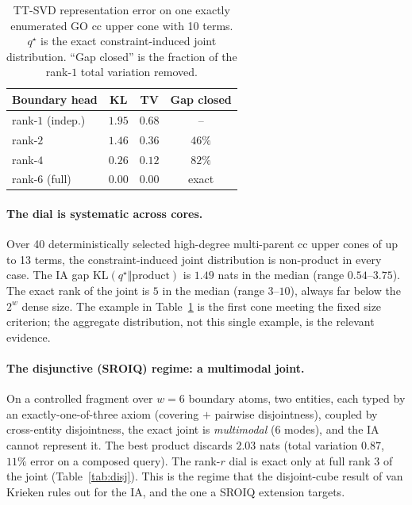 \documentclass[letterpaper]{article}
\begin{document}
\begin{table}[t]\centering
\caption{TT-SVD representation error on one exactly enumerated GO cc upper cone with 10 terms. $q^\star$ is the exact constraint-induced joint distribution. ``Gap closed'' is the fraction of the rank-$1$ total variation removed.}\label{tab:rank}
\footnotesize
\setlength{\tabcolsep}{3pt}
\begin{tabular}{@{}lccc@{}}
\toprule
Boundary head & KL & TV & Gap closed\\
\midrule
rank-$1$ (indep.) & $1.95$ & $0.68$ & -- \\
rank-$2$ & $1.46$ & $0.36$ & $46\%$\\
rank-$4$ & $0.26$ & $0.12$ & $82\%$\\
rank-$6$ (full) & $0.00$ & $0.00$ & exact\\
\bottomrule
\end{tabular}
\end{table}

\paragraph{The dial is systematic across cores.}
Over 40 deterministically selected high-degree multi-parent cc upper cones of up to 13 terms, the
constraint-induced joint distribution is non-product in every case. The IA gap
$\mathrm{KL}(q^\star\Vert\text{product})$ is $1.49$ nats in the median (range $0.54$--$3.75$).
The exact rank of the joint is $5$ in the median (range $3$--$10$), always far below the $2^{w}$
dense size. The example in Table~\ref{tab:rank} is the first cone meeting the fixed size criterion;
the aggregate distribution, not this single example, is the relevant evidence.

\paragraph{The disjunctive (SROIQ) regime: a multimodal joint.}
On a controlled fragment over $w{=}6$ boundary atoms, two entities, each typed by
an exactly-one-of-three axiom (covering $+$ pairwise disjointness), coupled by cross-entity
disjointness, the exact joint is \emph{multimodal} ($6$ modes), and the IA cannot represent it.
The best product discards $2.03$ nats (total variation $0.87$, $11\%$ error on a composed query). The
rank-$r$ dial is exact only at full rank $3$ of the joint (Table~\ref{tab:disj}). This is the
regime that the disjoint-cube result of van Krieken rules out for the IA, and the one a SROIQ extension targets.
\end{document}
